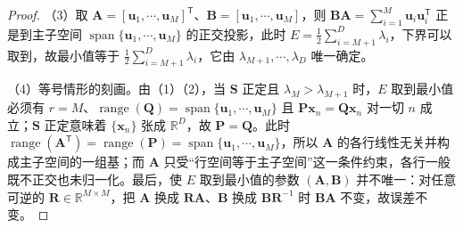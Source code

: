 \documentclass[../../main.tex]{subfiles}
\begin{document}
\begin{proof}
（3）取 $\bm{A}=[\bm{u}_1,\cdots,\bm{u}_M]^{\mathsf T}$、$\bm{B}=[\bm{u}_1,\cdots,\bm{u}_M]$，则 $\bm{B}\bm{A}=\sum_{i=1}^{M}\bm{u}_i\bm{u}_i^{\mathsf T}$ 正是到主子空间 $\operatorname{span}\{\bm{u}_1,\cdots,\bm{u}_M\}$ 的正交投影，此时 $E=\frac{1}{2}\sum_{i=M+1}^{D}\lambda_i$，下界可以取到，故最小值等于 $\frac{1}{2}\sum_{i=M+1}^{D}\lambda_i$，它由 $\lambda_{M+1},\cdots,\lambda_D$ 唯一确定。

（4）等号情形的刻画。由（1）（2），当 $\bm{S}$ 正定且 $\lambda_M>\lambda_{M+1}$ 时，$E$ 取到最小值必须有 $r=M$、$\operatorname{range}(\bm{Q})=\operatorname{span}\{\bm{u}_1,\cdots,\bm{u}_M\}$ 且 $\bm{P}\bm{x}_n=\bm{Q}\bm{x}_n$ 对一切 $n$ 成立；$\bm{S}$ 正定意味着 $\{\bm{x}_n\}$ 张成 $\mathbb{R}^{D}$，故 $\bm{P}=\bm{Q}$。此时 $\operatorname{range}(\bm{A}^{\mathsf T})=\operatorname{range}(\bm{P})=\operatorname{span}\{\bm{u}_1,\cdots,\bm{u}_M\}$，所以 $\bm{A}$ 的各行线性无关并构成主子空间的一组基；而 $\bm{A}$ 只受“行空间等于主子空间”这一条件约束，各行一般既不正交也未归一化。最后，使 $E$ 取到最小值的参数 $(\bm{A},\bm{B})$ 并不唯一：对任意可逆的 $\bm{R}\in\mathbb{R}^{M\times M}$，把 $\bm{A}$ 换成 $\bm{R}\bm{A}$、$\bm{B}$ 换成 $\bm{B}\bm{R}^{-1}$ 时 $\bm{B}\bm{A}$ 不变，故误差不变。
\end{proof}
\end{document}

